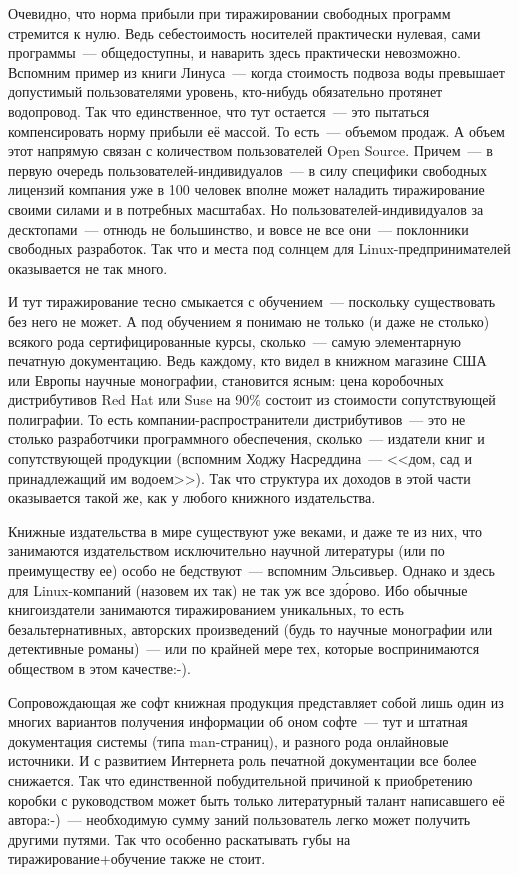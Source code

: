 Очевидно, что норма прибыли при тиражировании свободных программ стремится к нулю. Ведь себестоимость носителей практически нулевая, сами программы~--- общедоступны, и наварить здесь практически невозможно. Вспомним пример из книги Линуса~--- когда стоимость подвоза воды превышает допустимый пользователями уровень, кто-нибудь обязательно протянет водопровод. Так что единственное, что тут остается~--- это пытаться компенсировать норму прибыли её массой. То есть~--- объемом продаж. А объем этот напрямую связан с количеством пользователей Open Source. Причем~--- в первую очередь пользователей-индивидуалов~--- в силу специфики свободных лицензий компания уже в 100 человек вполне может наладить тиражирование своими силами и в потребных масштабах. Но пользователей-индивидуалов за десктопами~--- отнюдь не большинство, и вовсе не все они~--- поклонники свободных разработок. Так что и места под солнцем для Linux-предпринимателей оказывается не так много.

И тут тиражирование тесно смыкается с обучением~--- поскольку существовать без него не может. А под обучением я понимаю не только (и даже не столько) всякого рода сертифицированные курсы, сколько~--- самую элементарную печатную документацию. Ведь каждому, кто видел в книжном магазине США или Европы научные монографии, становится ясным: цена коробочных дистрибутивов Red Hat или Suse на 90\% состоит из стоимости сопутствующей полиграфии. То есть компании-распространители дистрибутивов~--- это не столько разработчики программного обеспечения, сколько~--- издатели книг и сопутствующей продукции (вспомним Ходжу Насреддина~--- <<дом, сад и принадлежащий им водоем>>). Так что структура их доходов в этой части оказывается такой же, как у любого книжного издательства.

Книжные издательства в мире существуют уже веками, и даже те из них, что занимаются издательством исключительно научной литературы (или по преимуществу ее) особо не бедствуют~--- вспомним Эльсивьер. Однако и здесь для Linux-компаний (назовем их так) не так уж все зд\'{о}рово. Ибо обычные книгоиздатели занимаются тиражированием уникальных, то есть безальтернативных, авторских произведений (будь то научные монографии или детективные романы)~--- или по крайней мере тех, которые воспринимаются обществом в этом качестве:-).

Сопровождающая же софт книжная продукция представляет собой лишь один из многих вариантов получения информации об оном софте~--- тут и штатная документация системы (типа man-страниц), и разного рода онлайновые источники. И с развитием Интернета роль печатной документации все более снижается. Так что единственной побудительной причиной к приобретению коробки с руководством может быть только литературный талант написавшего её автора:-)~--- необходимую сумму заний пользователь легко может получить другими путями. Так что особенно раскатывать губы на тиражирование+обучение также не стоит.

